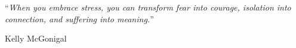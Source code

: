 \documentclass[
11pt, %
oneside, %
english, %
singlespacing, %
headsepline, %
]{MastersDoctoralThesis} %
\begin{document}
\cleardoublepage


 \vspace*{0.2\textheight}

 \noindent\enquote{\itshape When you embrace stress, you can transform fear into courage, isolation into connection, and suffering into meaning.}\bigbreak

 \hfill Kelly McGonigal

\end{document}
